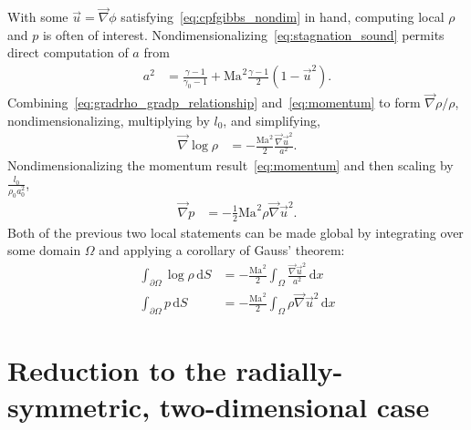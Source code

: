 \documentclass[letterpaper,11pt,nointlimits,reqno]{amsart}
\newcommand{\Mach}[1][]{\ensuremath{\mbox{Ma}_{#1}}}
\begin{document}
With some $\vec{u}=\vec{\nabla}\phi$ satisfying~\eqref{eq:cpfgibbs_nondim} in
hand, computing local $\rho$ and $p$ is often of interest.
Nondimensionalizing~\eqref{eq:stagnation_sound} permits direct computation of
$a$ from
\begin{align}
  a^2 &= \frac{\gamma-1}{\gamma_0-1}
       + \Mach^2\frac{\gamma-1}{2}\left(1-\vec{u}^2\right)
\label{eq:stagnation_sound_nondim}
.
\end{align}
Combining~\eqref{eq:gradrho_gradp_relationship} and~\eqref{eq:momentum} to form
$\vec{\nabla}\rho / \rho$, nondimensionalizing, multiplying by $l_0$, and
simplifying,
\begin{align}
  \vec{\nabla}\log\rho
  &=
  -\frac{\Mach^2}{2}\frac{\vec{\nabla}\vec{u}^2}{a^2}
.
\end{align}
Nondimensionalizing the momentum result~\eqref{eq:momentum} and then scaling by
$\frac{l_0}{\rho_0 a_0^2}$,
\begin{align}
  \vec{\nabla} p &= - \frac{1}{2}\Mach^2 \rho \vec{\nabla}\vec{u}^2
.
\end{align}
Both of the previous two local statements can be made global by integrating
over some domain $\Omega$ and applying a corollary of Gauss' theorem:
\begin{align}
  \int_{\partial\Omega} \log\rho \, \mathrm{d}S
  &=
  - \frac{\Mach^2}{2}\int_{\Omega}
    \frac{\vec{\nabla}\vec{u}^2}{a^2} \, \mathrm{d}x
\label{eq:logrho_nondim}
\\
  \int_{\partial\Omega} p \, \mathrm{d}S
  &=
  - \frac{\Mach^2}{2}\int_{\Omega} \rho \vec{\nabla}\vec{u}^2 \, \mathrm{d}x
\label{eq:p_nondim}
\end{align}


\section{Reduction to the radially-symmetric, two-dimensional case}
\end{document}
